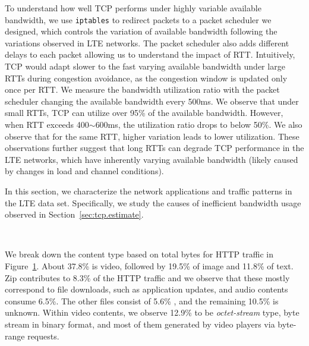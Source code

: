 To understand how well TCP performs under highly variable available bandwidth, we use \texttt{iptables} to redirect packets to a packet scheduler we designed, which controls the variation of available bandwidth following the variations observed in LTE networks. The packet scheduler also adds different delays to each packet allowing us to understand the impact of RTT. Intuitively, TCP would adapt slower to the fast varying available bandwidth under large RTTs during congestion avoidance, as the congestion window is updated only once per RTT. We measure the bandwidth utilization ratio with the packet scheduler changing the available bandwidth every 500ms. We observe that under small RTTs, TCP can utilize over 95\% of the available bandwidth. However, when RTT exceeds 400$\sim$600ms, the utilization ratio drops to below 50\%. We also observe that for the same RTT, higher variation leads to lower utilization. These observations further suggest that long RTTs can degrade TCP performance in the LTE networks, which have inherently varying available bandwidth (likely caused by changes in load and channel conditions).





\label{sec:tcp.app}

In this section, we characterize the network applications and traffic patterns in the LTE data set. Specifically, we study the causes of inefficient bandwidth usage observed in Section~\ref{sec:tcp.estimate}.


\label{sec:http_content}

\begin{figure}[t]
\centering
{}\\
\label{fig:content.type}
\end{figure}

We break down the content type based on total bytes for HTTP traffic in Figure~\ref{fig:content.type}.
About 37.8\% is video, followed by 19.5\% of image and 11.8\% of text. Zip contributes to 8.3\% of the HTTP traffic and we observe that these mostly correspond to file downloads, such as application updates, and audio contents consume 6.5\%. The other files consist of 5.6\% , and the remaining 10.5\% is unknown. Within video contents, we observe 12.9\% to be \emph{octet-stream} type, \ie byte stream in binary format, and most of them generated by video players via byte-range requests.

